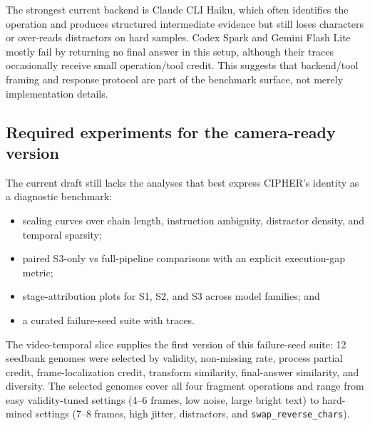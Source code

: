 The strongest current backend is Claude CLI Haiku, which often identifies the
operation and produces structured intermediate evidence but still loses
characters or over-reads distractors on hard samples. Codex Spark and Gemini
Flash Lite mostly fail by returning no final answer in this setup, although
their traces occasionally receive small operation/tool credit. This suggests
that backend/tool framing and response protocol are part of the benchmark
surface, not merely implementation details.

\subsection{Required experiments for the camera-ready version}

The current draft still lacks the analyses that best express CIPHER's identity
as a diagnostic benchmark:
\begin{itemize}
  \item scaling curves over chain length, instruction ambiguity, distractor
        density, and temporal sparsity;
  \item paired S3-only vs full-pipeline comparisons with an explicit
        execution-gap metric;
  \item stage-attribution plots for S1, S2, and S3 across model families; and
  \item a curated failure-seed suite with traces.
\end{itemize}

The video-temporal slice supplies the first version of this failure-seed suite:
12 seedbank genomes were selected by validity, non-missing rate, process
partial credit, frame-localization credit, transform similarity, final-answer
similarity, and diversity. The selected genomes cover all four fragment
operations and range from easy validity-tuned settings (4--6 frames, low noise,
large bright text) to hard-mined settings (7--8 frames, high jitter, distractors,
and \texttt{swap\_reverse\_chars}).
